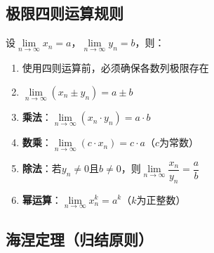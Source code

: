 \documentclass[../book.tex]{subfiles}
\begin{document}
    \subsection{极限四则运算规则}

    设$\lim\limits_{n\to\infty} x_n = a$，$\lim\limits_{n\to\infty} y_n = b$，则：

    \begin{enumerate}
        \item 使用四则运算前，必须确保各数列极限存在
        \item $\lim\limits_{n\to\infty} (x_n \pm y_n) = a \pm b$

        \item \textbf{乘法}：$\lim\limits_{n\to\infty} (x_n \cdot y_n) = a \cdot b$

        \item \textbf{数乘}：$\lim\limits_{n\to\infty} (c \cdot x_n) = c \cdot a$（$c$为常数）

        \item \textbf{除法}：若$y_n \neq 0$且$b \neq 0$，则$\lim\limits_{n\to\infty} \dfrac{x_n}{y_n} = \dfrac{a}{b}$

        \item \textbf{幂运算}：$\lim\limits_{n\to\infty} x_n^k = a^k$（$k$为正整数）
    \end{enumerate}

    \subsection{海涅定理（归结原则）}
\end{document}
